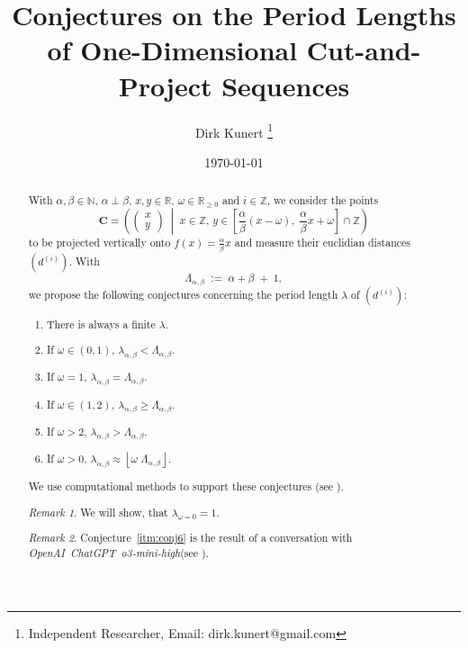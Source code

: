 \documentclass[11pt]{article}
\title{Conjectures on the Period Lengths of One-Dimensional Cut-and-Project Sequences}
\author{Dirk Kunert \thanks{Independent Researcher, Email: dirk.kunert@gmail.com}}
\date{\today}
\theoremstyle{remark}
\newtheorem{remark}{Remark}
\begin{document}
%
\newcommand{\showfigures}{true}
\newcommand{\todo}[1]{\textcolor{red}{TODO: {#1}}}
\newcommand{\langc}[0]{\mbox{C}\xspace}
\newcommand{\langp}[0]{\mbox{Python}\xspace}
\newcommand{\chat}[0]{\mbox{\emph{OpenAI ChatGPT o3-mini-high}}\xspace}
\newcommand{\function}[1]{\mbox{\texttt{#1}}\xspace}

\maketitle
%
\begin{abstract}
With $\alpha, \beta \in \mathbb{N}$, $\alpha \perp \beta$, $x, y \in \mathbb{R}$, $\omega \in \mathbb{R}_{\ge 0}$ and $i \in \mathbb{Z}$, we consider the points
%
\begin{equation}
\mathbf{C} 
= \left(
\begin{pmatrix} x \\ y \end{pmatrix}
\;\middle|\;
x \in \mathbb{Z},\,
y \in 
\left[\frac{\alpha}{\beta} (x - \omega),\; \frac{\alpha}{\beta} x + \omega\right] 
\cap \mathbb{Z}
\right)\label{eq:points}
\end{equation}
%
to be projected vertically onto $f(x) = \frac{\alpha}{\beta} x$ and measure their euclidian distances $\left( d^{(i)} \right)$.
%
With
\[
\Lambda_{\alpha, \beta} \;:=\; \alpha + \beta \;+\; 1,
\]
%
we propose the following conjectures concerning the period length $\lambda$ of $\left( d^{(i)} \right)$:
%
\begin{enumerate}
	\item \label{itm:conj1} There is always a finite $\lambda$.
 	\item \label{itm:conj2} If \(\omega \in (0,1)\), $\lambda_{\alpha, \beta} < \Lambda_{\alpha, \beta}$.
 	\item \label{itm:conj3} If \(\omega = 1\), $\lambda_{\alpha, \beta} = \Lambda_{\alpha, \beta}$.
 	\item \label{itm:conj4} If \(\omega \in (1,2)\), $\lambda_{\alpha, \beta} \ge \Lambda_{\alpha, \beta}$.
 	\item \label{itm:conj5} If \(\omega > 2\), $\lambda_{\alpha, \beta} > \Lambda_{\alpha, \beta}$.
 	\item \label{itm:conj6} If \(\omega > 0\), $\lambda_{\alpha, \beta} \approx \left\lfloor \omega \; \Lambda_{\alpha, \beta} \right\rfloor$.
\end{enumerate}
%
We use computational methods to support these conjectures (see \cite{Kunert2025}).
%
\begin{remark}
We will show, that $\lambda_{\omega = 0} = 1$.
\end{remark}
%
\begin{remark}
Conjecture~\ref{itm:conj6} is the result of a conversation with \chat (see \cite{ChatGPT}).
\end{remark}
\end{abstract}
\end{document}
